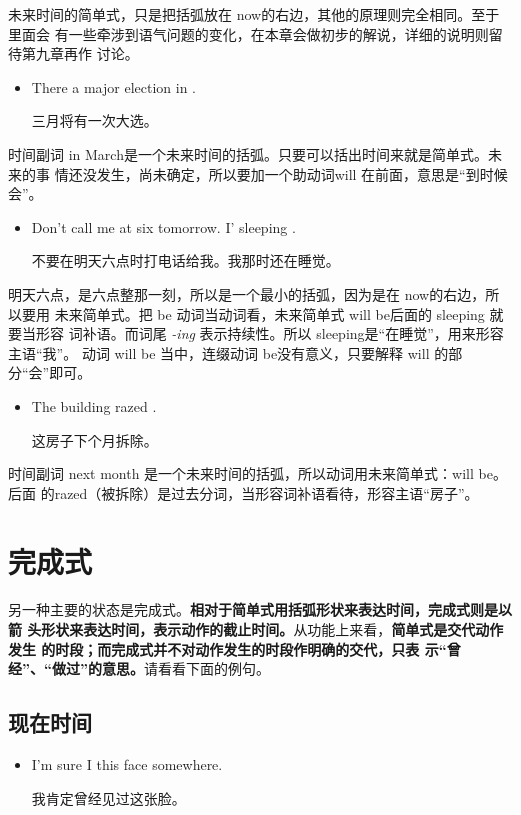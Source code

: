 未来时间的简单式，只是把括弧放在 now的右边，其他的原理则完全相同。至于里面会
有一些牵涉到语气问题的变化，在本章会做初步的解说，详细的说明则留待第九章再作
讨论。

\begin{itemize}
\item  There  a major election in .

  三月将有一次大选。
\end{itemize}

时间副词 in March是一个未来时间的括弧。只要可以括出时间来就是简单式。未来的事
情还没发生，尚未确定，所以要加一个助动词will 在前面，意思是“到时候会”。

\begin{itemize}
\item  Don't call me at six tomorrow. I' sleeping
  .

  不要在明天六点时打电话给我。我那时还在睡觉。
\end{itemize}

明天六点，是六点整那一刻，所以是一个最小的括弧，因为是在 now的右边，所以要用
未来简单式。把 be 动词当动词看，未来简单式 will be后面的 sleeping 就要当形容
词补语。而词尾 \emph{-ing} 表示持续性。所以 sleeping是“在睡觉”，用来形容主语“我”。
动词 will be 当中，连缀动词 be没有意义，只要解释 will 的部分“会”即可。

\begin{itemize}
\item  The building  razed .

  这房子下个月拆除。
\end{itemize}

时间副词 next month 是一个未来时间的括弧，所以动词用未来简单式：will be。后面
的razed（被拆除）是过去分词，当形容词补语看待，形容主语“房子”。

\section{完成式}

另一种主要的状态是完成式。\textbf{相对于简单式用括弧形状来表达时间，完成式则是以箭
  头形状来表达时间，表示动作的截止时间。}从功能上来看，\textbf{简单式是交代动作发生
  的时段；而完成式并不对动作发生的时段作明确的交代，只表
  示“曾经”、“做过”的意思。}请看看下面的例句。

\subsection{现在时间}
\begin{itemize}
\item  I'm sure I  this face somewhere.

  我肯定曾经见过这张脸。
\end{itemize}

